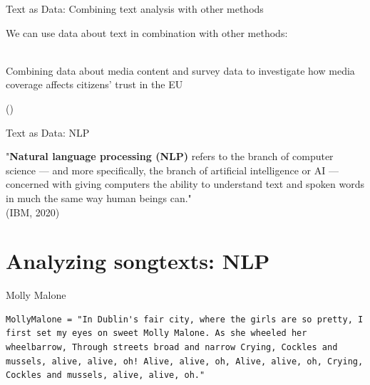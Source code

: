 \documentclass[handout]{beamer}
\begin{document}
\begin{frame}{Text as Data: \small{Combining text analysis with other methods}}
	
	We can use data about text in combination with other methods: \\~
	
	Combining data about media content and survey data to investigate how media coverage affects citizens' trust in the EU \\
	\begin{tiny}
		(\cite{brosius_trust_2019}) \\
	\end{tiny}
	
	
	
\end{frame}


\begin{frame}{Text as Data: NLP}
	
	"\textbf{Natural language processing (NLP)} refers to the branch of computer science — and more specifically, the branch of artificial intelligence or AI — concerned with giving computers the ability to understand text and spoken words in much the same way human beings can."  \\
	\tiny{(IBM, 2020)}
	
	
	
\end{frame}





\section{Analyzing songtexts: NLP}

\begin{frame}[fragile]{Molly Malone}
	
\begin{lstlisting} 
MollyMalone = "In Dublin's fair city, where the girls are so pretty, I first set my eyes on sweet Molly Malone. As she wheeled her wheelbarrow, Through streets broad and narrow Crying, Cockles and mussels, alive, alive, oh! Alive, alive, oh, Alive, alive, oh, Crying, Cockles and mussels, alive, alive, oh."  
\end{lstlisting}
	

\end{frame}
\end{document}
